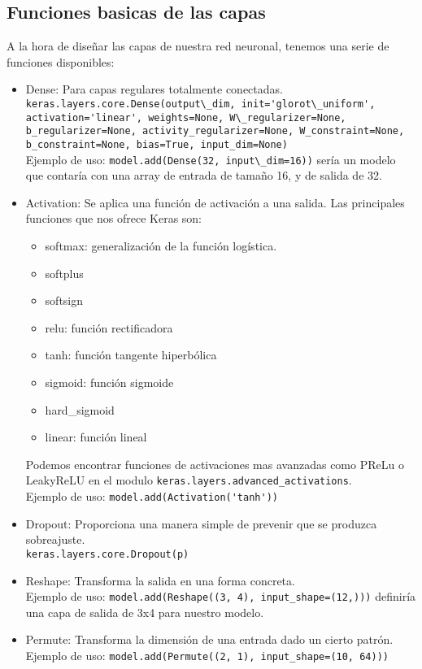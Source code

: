 \subsection{Funciones basicas de las capas}
A la hora de diseñar las capas de nuestra red neuronal, tenemos una serie de funciones disponibles:
\begin{itemize}
\item Dense: Para capas regulares totalmente conectadas.\\
\lstinline{keras.layers.core.Dense(output\_dim, init='glorot\_uniform', activation='linear', weights=None, W\_regularizer=None, b_regularizer=None, activity_regularizer=None, W_constraint=None, b_constraint=None, bias=True, input_dim=None)}\\
Ejemplo de uso: \lstinline{model.add(Dense(32, input\_dim=16))} sería un modelo que contaría con una array de entrada de tamaño 16, y de salida de 32.
\item Activation: Se aplica una función de activación a una salida. Las principales funciones que nos ofrece Keras son:
\begin{itemize}
\item softmax: generalización de la función logística.
\item softplus
\item softsign
\item relu: función rectificadora
\item tanh: función tangente hiperbólica
\item sigmoid: función sigmoide
\item hard\_sigmoid
\item linear: función lineal
\end{itemize}
Podemos encontrar funciones de activaciones mas avanzadas como PReLu o LeakyReLU en el modulo \lstinline{keras.layers.advanced_activations}.\\
Ejemplo de uso: \lstinline{model.add(Activation('tanh'))}
\item Dropout: Proporciona una manera simple de prevenir que se produzca sobreajuste.\\
\lstinline{keras.layers.core.Dropout(p)}
\item Reshape: Transforma la salida en una forma concreta.\\
Ejemplo de uso: \lstinline{model.add(Reshape((3, 4), input_shape=(12,)))}
definiría una capa de salida de 3x4 para nuestro modelo.
\item Permute: Transforma la dimensión de una entrada dado un cierto patrón.\\
Ejemplo de uso: \lstinline{model.add(Permute((2, 1), input_shape=(10, 64)))}
\end{itemize}

